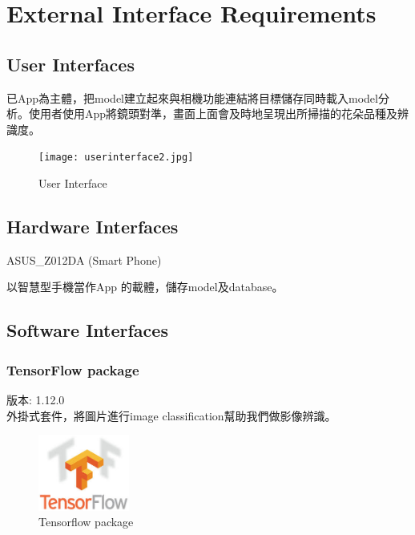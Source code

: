 \documentclass{scrreprt}
\begin{document}
\chapter{External Interface Requirements}

\section{User Interfaces}
\begin{CJK}{UTF8}{bkai}
		已App為主體，把model建立起來與相機功能連結將目標儲存同時載入model分析。使用者使用App將鏡頭對準，畫面上面會及時地呈現出所掃描的花朵品種及辨識度。
\end{CJK}
\begin{figure}[h]
\begin{center}
\texttt{[image: userinterface2.jpg]}
\end{center}
\caption{User Interface}
\end{figure}

\section{Hardware Interfaces}
ASUS_Z012DA (Smart Phone)  \\
\begin{CJK}{UTF8}{bkai}
		以智慧型手機當作App 的載體，儲存model及database。
\end{CJK}

\section{Software Interfaces}
\subsection{TensorFlow package}
\begin{CJK}{UTF8}{bkai}
版本: 1.12.0 \\
		外掛式套件，將圖片進行image classification幫助我們做影像辨識。
\end{CJK}
\begin{figure}[h]
\begin{center}
\includegraphics[width=3cm]{tensorflow.jpg}
\end{center}
\caption{Tensorflow package}
\end{figure}
\end{document}
